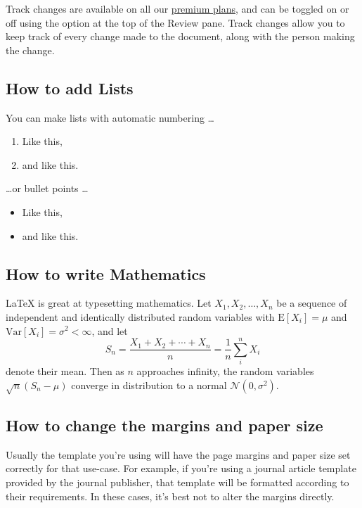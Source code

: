 \documentclass{article}
\begin{document}
    Track changes are available on all our \href{https://www.overleaf.com/user/subscription/plans}{premium plans}, and can be toggled on or off using the option at the top of the Review pane. Track changes allow you to keep track of every change made to the document, along with the person making the change.

    \subsection{How to add Lists}

    You can make lists with automatic numbering \dots

    \begin{enumerate}
        \item Like this,
        \item and like this.
    \end{enumerate}
    \dots or bullet points \dots
    \begin{itemize}
        \item Like this,
        \item and like this.
    \end{itemize}

    \subsection{How to write Mathematics}

    \LaTeX{} is great at typesetting mathematics. Let $X_1, X_2, \ldots, X_n$ be a sequence of independent and identically distributed random variables with $\text{E}[X_i] = \mu$ and $\text{Var}[X_i] = \sigma^2 < \infty$, and let
    \[S_n = \frac{X_1 + X_2 + \cdots + X_n}{n}
    = \frac{1}{n}\sum_{i}^{n} X_i\]
    denote their mean. Then as $n$ approaches infinity, the random variables $\sqrt{n}(S_n - \mu)$ converge in distribution to a normal $\mathcal{N}(0, \sigma^2)$.

    \subsection{How to change the margins and paper size}

    Usually the template you're using will have the page margins and paper size set correctly for that use-case. For example, if you're using a journal article template provided by the journal publisher, that template will be formatted according to their requirements. In these cases, it's best not to alter the margins directly.
\end{document}
